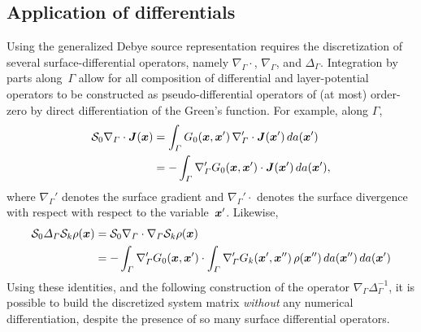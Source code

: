 \documentclass[11pt]{article}
\newcommand{\vct}{\vectorsym}
\newcommand{\surfdiv}{\nabla_\Gamma \cdot}
\newcommand{\surfdivp}{\nabla_\Gamma' \cdot}
\newcommand{\surfgrad}{\nabla_\Gamma}
\newcommand{\surflap}{\Delta_\Gamma}
\newcommand{\bx}{\vct{ x}}
\newcommand{\bJ}{\vct{ J}}
\newcommand{\cS}{\mathcal S}
\numberwithin{equation}{section}
\begin{document}
\subsection{Application of differentials}
\label{sec_surflap}

Using the generalized Debye source representation requires the
discretization of several surface-differential operators, namely
$\surfdiv$, $\surfgrad$, and $\surflap$.
Integration by parts along~$\Gamma$ allow for all composition of
differential and layer-potential operators to be constructed as
pseudo-differential operators of  (at most) order-zero
by direct differentiation of the Green's
function. For example, along $\Gamma$,
\begin{equation}
  \begin{aligned}
    \cS_0 \surfdiv \bJ (\bx) &= \int_\Gamma G_0(\bx,\bx') \, \surfdivp \bJ(\bx') \,
    da(\bx') \\
    &= - \int_\Gamma \surfgrad' G_0(\bx,\bx') \cdot \bJ(\bx') \, da(\bx'), \\
  \end{aligned}
\end{equation}
where $\surfgrad'$ denotes the surface gradient and
$\surfdivp$ denotes the surface divergence with respect
with respect to the
variable~$\bx'$.
Likewise, 
\begin{equation}
  \begin{aligned}
    \cS_0 \surflap \cS_k \rho (\bx) &= \cS_0 \surfdiv \surfgrad \cS_k
    \rho (\bx) \\
    &= -\int_\Gamma \surfgrad' G_0(\bx,\bx') \cdot \int_\Gamma
    \surfgrad' G_k(\bx',\bx'') \, \rho(\bx'') \, da(\bx'') \, da(\bx')
  \end{aligned}
\end{equation}
Using these identities, and the following construction of the operator
$\surfgrad \surflap^{-1}$, it is possible to build the discretized
system matrix {\em without} any numerical differentiation, despite the
presence of so many surface differential operators.
\end{document}
